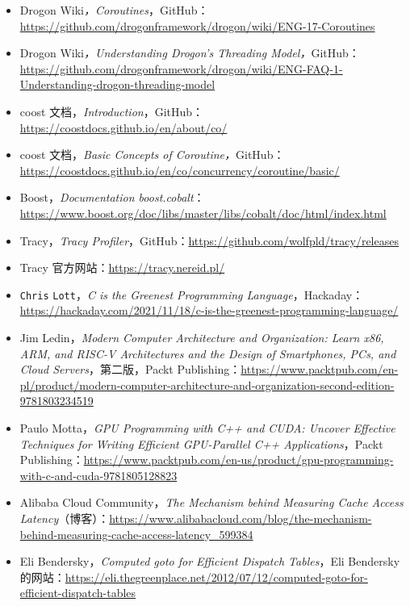 \begin{itemize}
\item Drogon Wiki\emph{，Coroutines}，GitHub：\href{https://github.com/drogonframework/drogon/wiki/ENG-17-Coroutines}{https://github.com/drogonframework/drogon/wiki/ENG-17-Coroutines}
\item Drogon Wiki\emph{，Understanding Drogon's Threading Model，}GitHub：\href{https://github.com/drogonframework/drogon/wiki/ENG-FAQ-1-Understanding-drogon-threading-model}{https://github.com/drogonframework/drogon/wiki/ENG-FAQ-1-Understanding-drogon-threading-model}
\item coost 文档，\emph{Introduction}，GitHub：\href{https://coostdocs.github.io/en/about/co/}{https://coostdocs.github.io/en/about/co/}
\item coost 文档，\emph{Basic Concepts of Coroutine，}GitHub：\href{https://coostdocs.github.io/en/co/concurrency/coroutine/basic/}{https://coostdocs.github.io/en/co/concurrency/coroutine/basic/}
\item Boost，\emph{Documentation boost.cobalt}：\href{https://www.boost.org/doc/libs/master/libs/cobalt/doc/html/index.html}{https://www.boost.org/doc/libs/master/libs/cobalt/doc/html/index.html}
\item Tracy，\emph{Tracy Profiler}，GitHub：\href{https://github.com/wolfpld/tracy/releases}{https://github.com/wolfpld/tracy/releases}
\item Tracy 官方网站：\href{https://tracy.nereid.pl/}{https://tracy.nereid.pl/}
\item \texttt{Chris} \texttt{Lott}，\emph{C is the Greenest Programming Language}，Hackaday：\href{https://hackaday.com/2021/11/18/c-is-the-greenest-programming-language/}{https://hackaday.com/2021/11/18/c-is-the-greenest-programming-language/}
\item Jim Ledin，\emph{Modern Computer Architecture and Organization: Learn x86, ARM, and RISC-V Architectures and the Design of Smartphones, PCs, and Cloud Servers}，第二版，Packt Publishing：\href{https://www.packtpub.com/en-pl/product/modern-computer-architecture-and-organization-second-edition-9781803234519}{https://www.packtpub.com/en-pl/product/modern-computer-architecture-and-organization-second-edition-9781803234519}
\item Paulo Motta，\emph{GPU Programming with C++ and CUDA: Uncover Effective Techniques for Writing Efficient GPU-Parallel C++ Applications}，Packt Publishing：\href{https://www.packtpub.com/en-us/product/gpu-programming-with-c-and-cuda-9781805128823}{https://www.packtpub.com/en-us/product/gpu-programming-with-c-and-cuda-9781805128823}
\item Alibaba Cloud Community，\emph{The Mechanism behind Measuring Cache Access Latency}（博客）：\href{https://www.alibabacloud.com/blog/the-mechanism-behind-measuring-cache-access-latency_599384}{https://www.alibabacloud.com/blog/the-mechanism-behind-measuring-cache-access-latency\_599384}
\item Eli Bendersky，\emph{Computed goto for Efficient Dispatch Tables}，Eli Bendersky 的网站：\href{https://eli.thegreenplace.net/2012/07/12/computed-goto-for-efficient-dispatch-tables}{https://eli.thegreenplace.net/2012/07/12/computed-goto-for-efficient-dispatch-tables}
\end{itemize}


